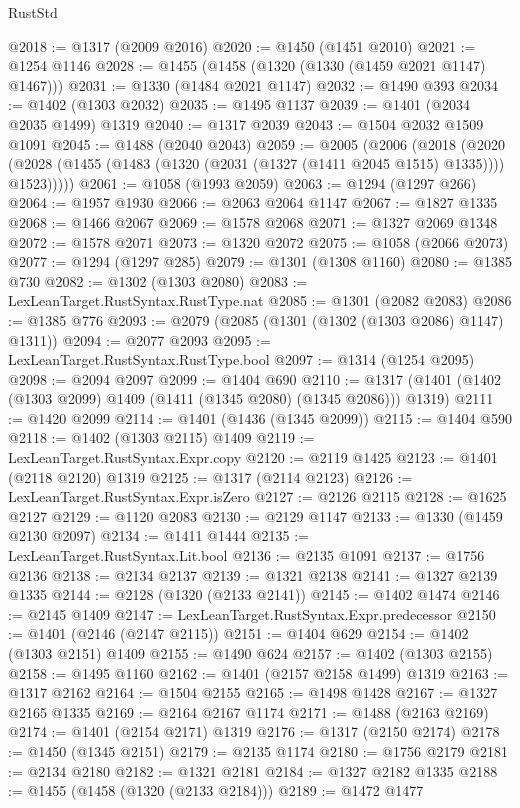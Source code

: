 \begin{lexlean}{RustStd}
\begin{coremodule}
{\begin{coremodule}
{{{{{{{{{{{{{{{{{{{{{{{{{{{{{{{{{{{{{{@2018 := @1317 (@2009 @2016)
@2020 := @1450 (@1451 @2010)
@2021 := @1254 @1146
@2028 := @1455 (@1458 (@1320 (@1330 (@1459 @2021 @1147) @1467)))
@2031 := @1330 (@1484 @2021 @1147)
@2032 := @1490 @393
@2034 := @1402 (@1303 @2032)
@2035 := @1495 @1137
@2039 := @1401 (@2034 @2035 @1499) @1319
@2040 := @1317 @2039
@2043 := @1504 @2032 @1509 @1091
@2045 := @1488 (@2040 @2043)
@2059 := @2005
    (@2006
      (@2018
        (@2020 (@2028 (@1455 (@1483 (@1320 (@2031 (@1327 (@1411 @2045 @1515) @1335)))) @1523)))))
@2061 := @1058 (@1993 @2059)
@2063 := @1294 (@1297 @266)
@2064 := @1957 @1930
@2066 := @2063 @2064 @1147
@2067 := @1827 @1335
@2068 := @1466 @2067
@2069 := @1578 @2068
@2071 := @1327 @2069 @1348
@2072 := @1578 @2071
@2073 := @1320 @2072
@2075 := @1058 (@2066 @2073)
@2077 := @1294 (@1297 @285)
@2079 := @1301 (@1308 @1160)
@2080 := @1385 @730
@2082 := @1302 (@1303 @2080)
@2083 := LexLeanTarget.RustSyntax.RustType.nat
@2085 := @1301 (@2082 @2083)
@2086 := @1385 @776
@2093 := @2079 (@2085 (@1301 (@1302 (@1303 @2086) @1147) @1311))
@2094 := @2077 @2093
@2095 := LexLeanTarget.RustSyntax.RustType.bool
@2097 := @1314 (@1254 @2095)
@2098 := @2094 @2097
@2099 := @1404 @690
@2110 := @1317 (@1401 (@1402 (@1303 @2099) @1409 (@1411 (@1345 @2080) (@1345 @2086))) @1319)
@2111 := @1420 @2099
@2114 := @1401 (@1436 (@1345 @2099))
@2115 := @1404 @590
@2118 := @1402 (@1303 @2115) @1409
@2119 := LexLeanTarget.RustSyntax.Expr.copy
@2120 := @2119 @1425
@2123 := @1401 (@2118 @2120) @1319
@2125 := @1317 (@2114 @2123)
@2126 := LexLeanTarget.RustSyntax.Expr.isZero
@2127 := @2126 @2115
@2128 := @1625 @2127
@2129 := @1120 @2083
@2130 := @2129 @1147
@2133 := @1330 (@1459 @2130 @2097)
@2134 := @1411 @1444
@2135 := LexLeanTarget.RustSyntax.Lit.bool
@2136 := @2135 @1091
@2137 := @1756 @2136
@2138 := @2134 @2137
@2139 := @1321 @2138
@2141 := @1327 @2139 @1335
@2144 := @2128 (@1320 (@2133 @2141))
@2145 := @1402 @1474
@2146 := @2145 @1409
@2147 := LexLeanTarget.RustSyntax.Expr.predecessor
@2150 := @1401 (@2146 (@2147 @2115))
@2151 := @1404 @629
@2154 := @1402 (@1303 @2151) @1409
@2155 := @1490 @624
@2157 := @1402 (@1303 @2155)
@2158 := @1495 @1160
@2162 := @1401 (@2157 @2158 @1499) @1319
@2163 := @1317 @2162
@2164 := @1504 @2155
@2165 := @1498 @1428
@2167 := @1327 @2165 @1335
@2169 := @2164 @2167 @1174
@2171 := @1488 (@2163 @2169)
@2174 := @1401 (@2154 @2171) @1319
@2176 := @1317 (@2150 @2174)
@2178 := @1450 (@1345 @2151)
@2179 := @2135 @1174
@2180 := @1756 @2179
@2181 := @2134 @2180
@2182 := @1321 @2181
@2184 := @1327 @2182 @1335
@2188 := @1455 (@1458 (@1320 (@2133 @2184)))
@2189 := @1472 @1477
}}}}}}}}}}}}}}}}}}}}}}}}}}}}}}}}}}}}}}
\end{coremodule}}
\end{coremodule}
\end{lexlean}

